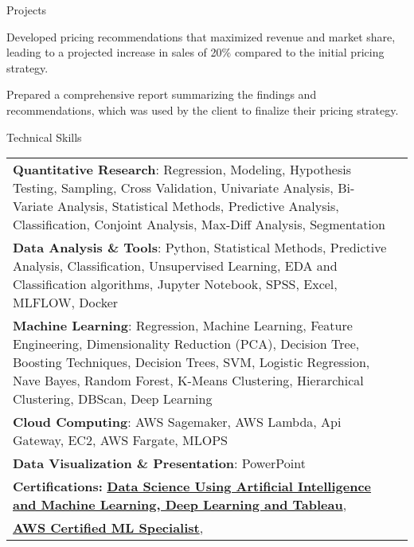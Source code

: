 \documentclass{resume} %
\begin{document}
\begin{rSection}{Projects}
\begin{rSubsection}
                                    \item Developed pricing recommendations that maximized revenue and market share, leading to a projected increase in sales of 20\% compared to the initial pricing strategy.
                                    \item Prepared a comprehensive report summarizing the findings and recommendations, which was used by the client to finalize their pricing strategy.
                            \end{rSubsection}
            \end{rSection}

    \begin{rSection}{Technical Skills}
        \begin{tabular}{ @{} l @{\hspace{1ex}} l }
                                \textbf{Quantitative Research}: Regression, Modeling, Hypothesis Testing, Sampling, Cross Validation, Univariate Analysis, Bi{-}Variate Analysis, Statistical Methods, Predictive Analysis, Classification, Conjoint Analysis, Max{-}Diff Analysis, Segmentation\\
                                \textbf{Data Analysis \& Tools}: Python, Statistical Methods, Predictive Analysis, Classification, Unsupervised Learning, EDA and Classification algorithms, Jupyter Notebook, SPSS, Excel, MLFLOW, Docker\\
                                \textbf{Machine Learning}: Regression, Machine Learning, Feature Engineering, Dimensionality Reduction (PCA), Decision Tree, Boosting Techniques, Decision Trees, SVM, Logistic Regression, Nave Bayes, Random Forest, K{-}Means Clustering, Hierarchical Clustering, DBScan, Deep Learning\\
                                \textbf{Cloud Computing}: AWS Sagemaker, AWS Lambda, Api Gateway, EC2, AWS Fargate, MLOPS\\
                                \textbf{Data Visualization \& Presentation}: PowerPoint\\
                        \textbf{Certifications:} 
                                            \href{None}{\textbf{Data Science Using Artificial Intelligence and Machine Learning, Deep Learning and Tableau}},\\
                                            \href{None}{\textbf{AWS Certified ML Specialist}},\\
                                 
        \end{tabular}
    \end{rSection}
 
\end{document}
